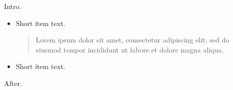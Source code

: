 \documentclass[11pt]{article}
\begin{document}
Intro.
\begin{itemize}
\item Short item text.
\begin{quote}
Lorem ipsum dolor sit amet, consectetur adipiscing elit, sed do eiusmod tempor incididunt ut labore et dolore magna aliqua.
\end{quote}
\item Short item text.
\end{itemize}
After.
\end{document}

